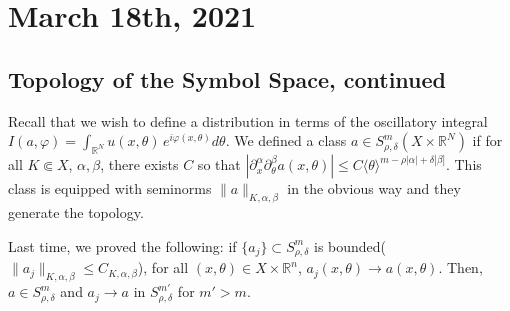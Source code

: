 \documentclass[12pt]{scrartcl}
\newcommand{\R}{\mathbb{R}}
\newcommand{\<}{\langle}
\renewcommand{\>}{\rangle}
\let \phi \varphi
\begin{document}
\section{March 18th, 2021}
\subsection{Topology of the Symbol Space, continued}
Recall that we wish to define a distribution in terms of the oscillatory integral $I(a, \phi) = \int_{\R^N} u(x, \theta)\, e^{i\phi(x, \theta)} d\theta$.  We defined a class $a \in S_{\rho, \delta}^m (X \times \R^N)$ if for all $K \Subset X$, $\alpha, \beta$, there exists $C$ so that $|\partial_x^\alpha \partial_\theta^\beta a(x, \theta)| \le C\<\theta\>^{m-\rho|\alpha| + \delta|\beta|}$.  This class is equipped with seminorms $\|a\|_{K, \alpha, \beta}$ in the obvious way and they generate the topology.

Last time, we proved the following:  if $\{a_j\} \subset S_{\rho, \delta}^m$ is bounded($\|a_j\|_{K, \alpha, \beta} \le C_{K, \alpha, \beta}$), for all $(x, \theta) \in X \times \R^n$, $a_j(x, \theta) \to a(x, \theta)$.  Then, $a \in S_{\rho, \delta}^m$ and $a_j \to a$ in $S_{\rho, \delta}^{m'}$ for $m' > m$.
\end{document}
